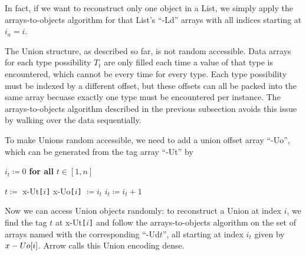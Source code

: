 \documentclass[10pt, conference, compsocconf]{IEEEtran}
\begin{document}
In fact, if we want to reconstruct only one object in a List, we simply apply the arrays-to-objects algorithm for that List's ``-Ld'' arrays with all indices starting at $i_a = i$.


The Union structure, as described so far, is not random accessible. Data arrays for each type possibility $T_t$ are only filled each time a value of that type is encountered, which cannot be every time for every type. Each type possibility must be indexed by a different offset, but these offsets can all be packed into the same array becuase exactly one type must be encountered per instance. The arrays-to-objects algorithm described in the previous subsection avoids this issue by walking over the data sequentially.

To make Unions random accessible, we need to add a union offset array ``-Uo'', which can be generated from the tag array ``-Ut'' by
\begin{algorithmic}
\vspace{0.15 cm}
\STATE $i_t \coloneqq 0$ {\bf for all} $t \in [1, n]$

\vspace{0.15 cm}
\STATE $t \coloneqq$ \mbox{x-Ut}{\tt [}$i${\tt ]}
\STATE \mbox{x-Uo}{\tt [}$i${\tt ]} $\coloneqq i_t$
\STATE $i_t \coloneqq i_t + 1$
\ENDFOR
\end{algorithmic}

Now we can access Union objects randomly: to reconstruct a Union at index $i$, we find the tag $t$ at x-Ut{\tt [}$i${\tt ]} and follow the arrays-to-objects algorithm on the set of arrays named with the corresponding ``-Ud$t$'', all starting at index $i_t$ given by $\mbox{x-Uo{\tt [}}i\mbox{\tt]}$. Arrow calls this Union encoding dense.
\end{document}
